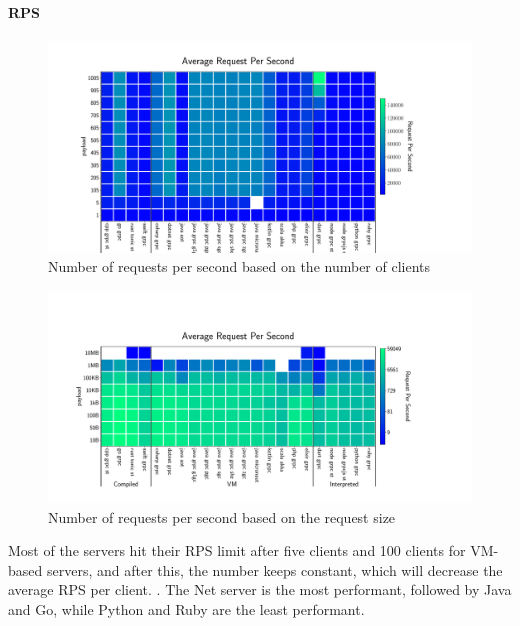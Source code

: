 \paragraph{RPS}
\begin{figure}[!hbt]
    \begin{center}
        \includegraphics[width=1.2\linewidth]{imgs/rps_clients}
    \end{center}
    \caption{Number of requests per second based on the number of clients}\label{fig:rps_clients}
\end{figure}

\begin{figure}[!hbt]
    \begin{center}
        \includegraphics[width=1.2\linewidth]{imgs/rps_payload}
    \end{center}
    \caption{Number of requests per second based on the request size}\label{fig:rps_payload}
\end{figure}
Most of the servers hit their RPS limit after five clients and 100 clients for VM-based servers, and after this, the number keeps constant, which will decrease the average RPS per client.
. The Net server is the most performant, followed by Java and Go, while Python and Ruby are the least performant.

